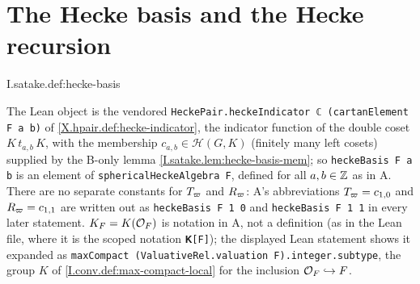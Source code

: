 \section{The Hecke basis and the Hecke recursion}

\begin{definition}
\end{definition}
\begin{tfformal}{I.satake.def:hecke-basis}
\begin{tffidelity}
The Lean object is the vendored \texttt{HeckePair.heckeIndicator ℂ (cartanElement F a b)} of \cref{X.hpair.def:hecke-indicator}, the indicator function of the double coset $K\,t_{a,b}\,K$, with the membership $c_{a,b}\in\mathcal H(G,K)$ (finitely many left cosets) supplied by the B-only lemma \cref{I.satake.lem:hecke-basis-mem}; so \texttt{heckeBasis F a b} is an element of \texttt{sphericalHeckeAlgebra F}, defined for all $a,b\in\mathbb{Z}$ as in A. There are no separate constants for $T_\varpi$ and $R_\varpi$: A's abbreviations $T_\varpi=c_{1,0}$ and $R_\varpi=c_{1,1}$ are written out as \texttt{heckeBasis F 1 0} and \texttt{heckeBasis F 1 1} in every later statement. $K_F=K(\mathcal{O}_F)$ is notation in A, not a definition (as in the Lean file, where it is the scoped notation \texttt{𝐊[F]}); the displayed Lean statement shows it expanded as \texttt{maxCompact (ValuativeRel.valuation F).integer.subtype}, the group $K$ of \cref{I.conv.def:max-compact-local} for the inclusion $\mathcal{O}_F\hookrightarrow F$.
\end{tffidelity}
\end{tfformal}

